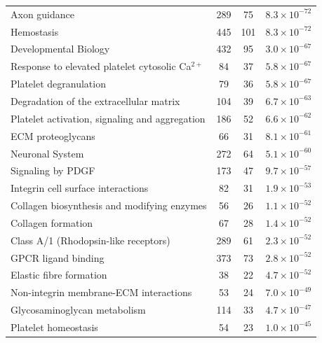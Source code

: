 \begin{table}[!hp]
{\begin{tabular}{lccc}
  \rowcolor{Cluster_Red!15}
  Axon guidance & 289 &  75 & $8.3 \times 10^{-72}$ \\ 
  \rowcolor{Cluster_Red!20}
  Hemostasis & 445 & 101 & $8.3 \times 10^{-72}$ \\ 
  \rowcolor{Cluster_Red!15}
  Developmental Biology & 432 &  95 & $3.0 \times 10^{-67}$ \\ 
  \rowcolor{Cluster_Red!20}
  Response to elevated platelet cytosolic Ca$^{2+}$ &  84 &  37 & $5.8 \times 10^{-67}$ \\ 
  \rowcolor{Cluster_Red!15}
  Platelet degranulation &  79 &  36 & $5.8 \times 10^{-67}$ \\ 
  \rowcolor{Cluster_Red!20}
  Degradation of the extracellular matrix & 104 &  39 & $6.7 \times 10^{-63}$ \\ 
  \rowcolor{Cluster_Red!15}
  Platelet activation, signaling and aggregation & 186 &  52 & $6.6 \times 10^{-62}$ \\ 
  \rowcolor{Cluster_Red!20}
  ECM proteoglycans &  66 &  31 & $8.1 \times 10^{-61}$ \\ 
  \rowcolor{Cluster_Red!15}
  Neuronal System & 272 &  64 & $5.1 \times 10^{-60}$ \\ 
  \rowcolor{Cluster_Red!20}
  Signaling by PDGF & 173 &  47 & $9.7 \times 10^{-57}$ \\ 
  \rowcolor{Cluster_Red!15}
  Integrin cell surface interactions &  82 &  31 & $1.9 \times 10^{-53}$ \\ 
  \rowcolor{Cluster_Red!20}
  Collagen biosynthesis and modifying enzymes &  56 &  26 & $1.1 \times 10^{-52}$ \\ 
  \rowcolor{Cluster_Red!15}
  Collagen formation &  67 &  28 & $1.4 \times 10^{-52}$ \\ 
  \rowcolor{Cluster_Red!20}
  Class A/1 (Rhodopsin-like receptors) & 289 &  61 & $2.3 \times 10^{-52}$ \\ 
  \rowcolor{Cluster_Red!15}
  GPCR ligand binding & 373 &  73 & $2.8 \times 10^{-52}$ \\ 
  \rowcolor{Cluster_Red!20}
  Elastic fibre formation &  38 &  22 & $4.7 \times 10^{-52}$ \\ 
  \rowcolor{Cluster_Red!15}
  Non-integrin membrane-ECM interactions &  53 &  24 & $7.0 \times 10^{-49}$ \\ 
  \rowcolor{Cluster_Red!20}
  Glycosaminoglycan metabolism & 114 &  33 & $4.7 \times 10^{-47}$ \\ 
  \rowcolor{Cluster_Red!15}
  Platelet homeostasis &  54 &  23 & $1.0 \times 10^{-45}$ \\ 
 \hline
\end{tabular}
}
\end{table}

